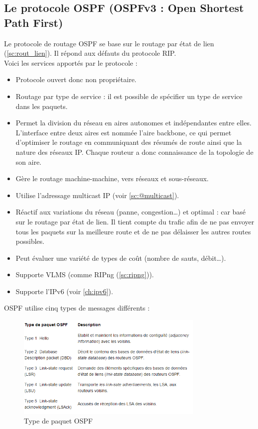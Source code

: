   \subsection{Le protocole OSPF (OSPFv3 : Open Shortest Path First)}
Le protocole de routage OSPF se base sur le routage par état de lien (\ref{sc:rout_lien}). Il répond aux défauts du protocole RIP.
\\
Voici les services apportés par le protocole :
    \begin{itemize}

    \item Protocole ouvert donc non propriétaire.
    \item Routage par type de service : il est possible de spécifier un type de service dans les paquets.
    \item Permet la division du réseau en aires autonomes et indépendantes entre elles. L’interface entre deux aires est nommée l’aire backbone, ce qui permet d’optimiser le routage en communiquant des résumés de route ainsi que la nature des réseaux IP. Chaque routeur a donc connaissance de la topologie de son aire.
    \item Gère le routage machine-machine, vers réseaux et sous-réseaux.
    \item Utilise l’adressage multicast IP (voir \ref{sc:@multicast}).
    \item Réactif aux variations du réseau (panne, congestion…) et optimal : car basé sur le routage par état de lien. Il tient compte du trafic afin de ne pas envoyer tous les paquets sur la meilleure route et de ne pas délaisser les autres routes possibles.
    \item Peut évaluer une variété de types de coût (nombre de sauts, débit…). 
    \item Supporte VLMS (comme RIPng (\ref{sc:ripng})).
    \item Supporte l’IPv6 (voir \ref{ch:ipv6}).

    \end{itemize}
\medskip

OSPF utilise cinq types de messages différents :

\begin{figure}[H]
    \includegraphics[width=340px]{figures/OSPF_type_paquet.PNG}
    \centering
    \caption{Type de paquet OSPF \cite{Xospf}}
    \end{figure}
    
